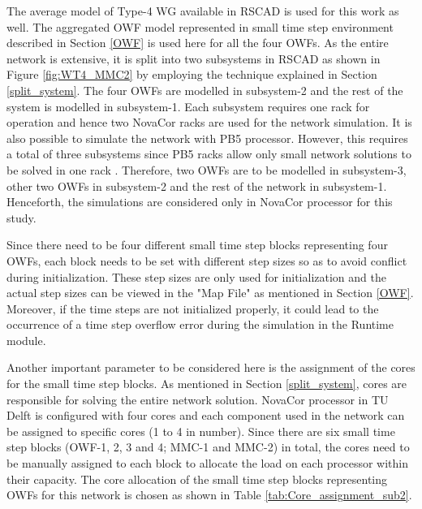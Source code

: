 The average model of Type-4 \gls{WG} available in RSCAD is used for this work as well. The aggregated \gls{OWF} model represented in small time step environment described in Section \ref{OWF} is used here for all the four \gls{OWF}s. As the entire network is extensive, it is split into two subsystems in RSCAD as shown in Figure \ref{fig:WT4_MMC2} by employing the technique explained in Section \ref{split_system}. The four \gls{OWF}s are modelled in subsystem-2 and the rest of the system is modelled in subsystem-1. Each subsystem requires one rack for operation and hence two NovaCor racks are used for the network simulation. It is also possible to simulate the network with PB5 processor. However, this requires a total of three subsystems since PB5 racks allow only small network solutions to be solved in one rack \cite{noauthor_pb5_nodate_1}. Therefore, two \gls{OWF}s are to be modelled in subsystem-3, other two \gls{OWF}s in subsystem-2 and the rest of the network in subsystem-1. Henceforth, the simulations are considered only in NovaCor processor for this study.  


Since there need to be four different small time step blocks representing four \gls{OWF}s, each block needs to be set with different step sizes so as to avoid conflict during initialization. These step sizes are only used for initialization and the actual step sizes can be viewed in the "Map File" as mentioned in Section \ref{OWF}. Moreover, if the time steps are not initialized properly, it could lead to the occurrence of a time step overflow error during the simulation in the Runtime module. 


Another important parameter to be considered here is the assignment of the cores for the small time step blocks. As mentioned in Section \ref{split_system}, cores are responsible for solving the entire network solution. NovaCor processor in TU Delft is configured with four cores and each component used in the network can be assigned to specific cores (1 to 4 in number). Since there are six small time step blocks (\gls{OWF}-1, 2, 3 and 4; \gls{MMC}-1 and \gls{MMC}-2) in total, the cores need to be manually assigned to each block to allocate the load on each processor within their capacity. The core allocation of the small time step blocks representing \gls{OWF}s for this network is chosen as shown in Table \ref{tab:Core_assignment_sub2}.  

   

